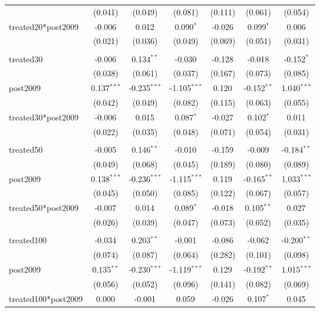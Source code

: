 \documentclass[12pt]{article}
\begin{document}
\begin{table}[!htbp]
\begin{tabular}{@{\extracolsep{5pt}}lcccccc}
  & (0.041) & (0.049) & (0.081) & (0.111) & (0.061) & (0.054) \\
 treated20*post2009 & -0.006$^{}$ & 0.012$^{}$ & 0.090$^{*}$ & -0.026$^{}$ & 0.099$^{*}$ & 0.006$^{}$ \\
  & (0.021) & (0.036) & (0.049) & (0.069) & (0.051) & (0.031) \\
\hline \\[-1.8ex]
 treated30 & -0.006$^{}$ & 0.134$^{**}$ & -0.030$^{}$ & -0.128$^{}$ & -0.018$^{}$ & -0.152$^{*}$ \\
  & (0.038) & (0.061) & (0.037) & (0.167) & (0.073) & (0.085) \\
 post2009 & 0.137$^{***}$ & -0.235$^{***}$ & -1.105$^{***}$ & 0.120$^{}$ & -0.152$^{**}$ & 1.040$^{***}$ \\
  & (0.042) & (0.049) & (0.082) & (0.115) & (0.063) & (0.055) \\
 treated30*post2009 & -0.006$^{}$ & 0.015$^{}$ & 0.087$^{*}$ & -0.027$^{}$ & 0.102$^{*}$ & 0.011$^{}$ \\
  & (0.022) & (0.035) & (0.048) & (0.071) & (0.054) & (0.031) \\
\hline \\[-1.8ex]
 treated50 & -0.005$^{}$ & 0.146$^{**}$ & -0.010$^{}$ & -0.159$^{}$ & -0.009$^{}$ & -0.184$^{**}$ \\
  & (0.049) & (0.068) & (0.045) & (0.189) & (0.080) & (0.089) \\
 post2009 & 0.138$^{***}$ & -0.236$^{***}$ & -1.115$^{***}$ & 0.119$^{}$ & -0.165$^{**}$ & 1.033$^{***}$ \\
  & (0.045) & (0.050) & (0.085) & (0.122) & (0.067) & (0.057) \\
 treated50*post2009 & -0.007$^{}$ & 0.014$^{}$ & 0.089$^{*}$ & -0.018$^{}$ & 0.105$^{**}$ & 0.027$^{}$ \\
  & (0.026) & (0.039) & (0.047) & (0.073) & (0.052) & (0.035) \\
\hline \\[-1.8ex]
 treated100 & -0.034$^{}$ & 0.203$^{**}$ & -0.001$^{}$ & -0.086$^{}$ & -0.062$^{}$ & -0.200$^{**}$ \\
  & (0.074) & (0.087) & (0.064) & (0.282) & (0.101) & (0.098) \\
 post2009 & 0.135$^{**}$ & -0.230$^{***}$ & -1.119$^{***}$ & 0.129$^{}$ & -0.192$^{**}$ & 1.015$^{***}$ \\
  & (0.056) & (0.052) & (0.096) & (0.141) & (0.082) & (0.069) \\
 treated100*post2009 & 0.000$^{}$ & -0.001$^{}$ & 0.059$^{}$ & -0.026$^{}$ & 0.107$^{*}$ & 0.045$^{}$ \\

\end{tabular}
\end{table}
\end{document}
